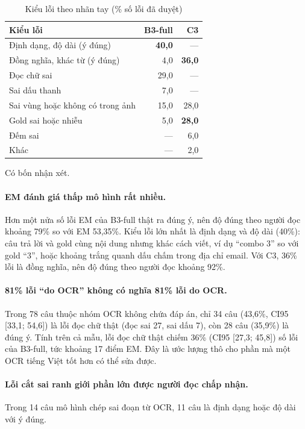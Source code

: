 \begin{table}[htbp]
\caption{Kiểu lỗi theo nhãn tay (\% số lỗi đã duyệt)}
\label{tab:dis-audit-types}
\centering
\small
\begin{tabular}{p{}rr}
\toprule
\textbf{Kiểu lỗi} & \textbf{B3-full} & \textbf{C3} \\
\midrule
Định dạng, độ dài (ý đúng) & \textbf{40,0} & --- \\
Đồng nghĩa, khác từ (ý đúng) & 4,0 & \textbf{36,0} \\
Đọc chữ sai & 29,0 & --- \\
Sai dấu thanh & 7,0 & --- \\
Sai vùng hoặc không có trong ảnh & 15,0 & 28,0 \\
Gold sai hoặc nhiễu & 5,0 & \textbf{28,0} \\
Đếm sai & --- & 6,0 \\
Khác & --- & 2,0 \\
\bottomrule
\end{tabular}
\end{table}

Có bốn nhận xét.

\paragraph{EM đánh giá thấp mô hình rất nhiều.} Hơn một nửa số lỗi EM của B3-full
thật ra đúng ý, nên độ đúng theo người đọc khoảng 79\% so với EM 53,35\%. Kiểu lỗi
lớn nhất là định dạng và độ dài (40\%): câu trả lời và gold cùng nội dung nhưng
khác cách viết, ví dụ ``combo 3'' so với gold ``3'', hoặc khoảng trắng quanh dấu
chấm trong địa chỉ email. Với C3, 36\% lỗi là đồng nghĩa, nên độ đúng theo người
đọc khoảng 92\%.

\paragraph{81\% lỗi ``do OCR'' không có nghĩa 81\% lỗi do OCR.} Trong 78 câu thuộc
nhóm OCR không chứa đáp án, chỉ 34 câu (43,6\%, CI95 [33,1; 54,6]) là lỗi đọc chữ
thật (đọc sai 27, sai dấu 7), còn 28 câu (35,9\%) là đúng ý. Tính trên cả mẫu, lỗi
đọc chữ thật chiếm 36\% (CI95 [27,3; 45,8]) số lỗi của B3-full, tức khoảng 17 điểm
EM. Đây là ước lượng thô cho phần mà một OCR tiếng Việt tốt hơn có thể sửa được.

\paragraph{Lỗi cắt sai ranh giới phần lớn được người đọc chấp nhận.} Trong 14 câu
mô hình chép sai đoạn từ OCR, 11 câu là định dạng hoặc độ dài với ý đúng.


